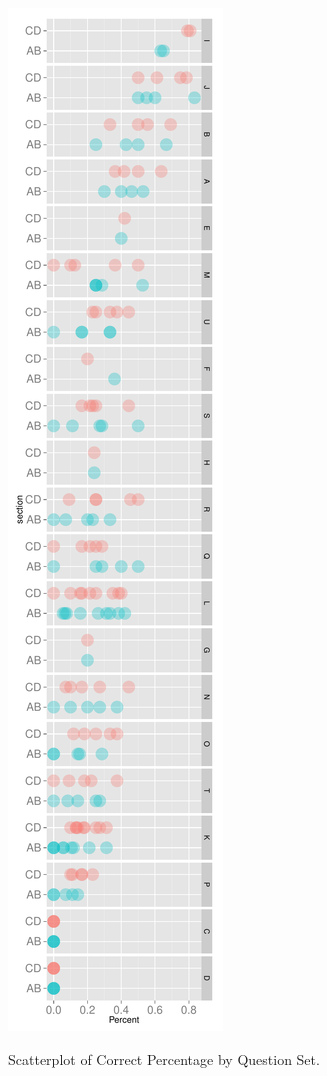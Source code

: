 \documentclass[12pt,nohyper]{tufte-handout}\usepackage[]{graphicx}\usepackage[]{color}
\begin{document}
\begin{marginfigure}\includegraphics[width=0.95\linewidth]{Topic06_Scatterplot_QSetpct}
\caption{\label{mar:Qsetpct}Scatterplot of Correct Percentage by Question Set.}\end{marginfigure}%
\end{document}

